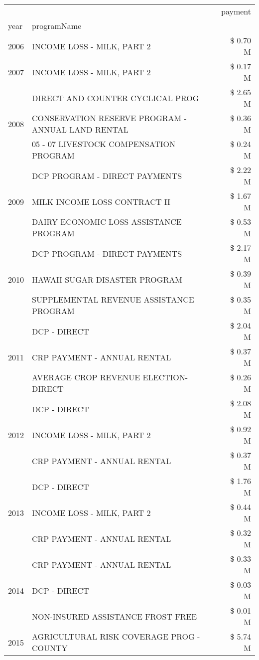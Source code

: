 \begin{tabular}{llr}
\toprule
 &  & payment \\
year & programName &  \\
\midrule
2006 & INCOME LOSS - MILK, PART 2 & \$ 0.70 M \\
\cline{1-3}
2007 & INCOME LOSS - MILK, PART 2 & \$ 0.17 M \\
\cline{1-3}
\multirow[t]{3}{*}{2008} & DIRECT AND COUNTER CYCLICAL PROG & \$ 2.65 M \\
 & CONSERVATION RESERVE PROGRAM - ANNUAL LAND RENTAL & \$ 0.36 M \\
 & 05 - 07 LIVESTOCK COMPENSATION PROGRAM & \$ 0.24 M \\
\cline{1-3}
\multirow[t]{3}{*}{2009} & DCP PROGRAM - DIRECT PAYMENTS & \$ 2.22 M \\
 & MILK INCOME LOSS CONTRACT II & \$ 1.67 M \\
 & DAIRY ECONOMIC LOSS ASSISTANCE PROGRAM & \$ 0.53 M \\
\cline{1-3}
\multirow[t]{3}{*}{2010} & DCP PROGRAM - DIRECT PAYMENTS & \$ 2.17 M \\
 & HAWAII SUGAR DISASTER PROGRAM & \$ 0.39 M \\
 & SUPPLEMENTAL REVENUE ASSISTANCE PROGRAM & \$ 0.35 M \\
\cline{1-3}
\multirow[t]{3}{*}{2011} & DCP - DIRECT & \$ 2.04 M \\
 & CRP PAYMENT - ANNUAL RENTAL & \$ 0.37 M \\
 & AVERAGE CROP REVENUE ELECTION-DIRECT & \$ 0.26 M \\
\cline{1-3}
\multirow[t]{3}{*}{2012} & DCP - DIRECT & \$ 2.08 M \\
 & INCOME LOSS - MILK, PART 2 & \$ 0.92 M \\
 & CRP PAYMENT - ANNUAL RENTAL & \$ 0.37 M \\
\cline{1-3}
\multirow[t]{3}{*}{2013} & DCP - DIRECT & \$ 1.76 M \\
 & INCOME LOSS - MILK, PART 2 & \$ 0.44 M \\
 & CRP PAYMENT - ANNUAL RENTAL & \$ 0.32 M \\
\cline{1-3}
\multirow[t]{3}{*}{2014} & CRP PAYMENT - ANNUAL RENTAL & \$ 0.33 M \\
 & DCP - DIRECT & \$ 0.03 M \\
 & NON-INSURED ASSISTANCE FROST FREE & \$ 0.01 M \\
\cline{1-3}
\multirow[t]{3}{*}{2015} & AGRICULTURAL RISK COVERAGE PROG - COUNTY & \$ 5.74 M \\

\end{tabular}
